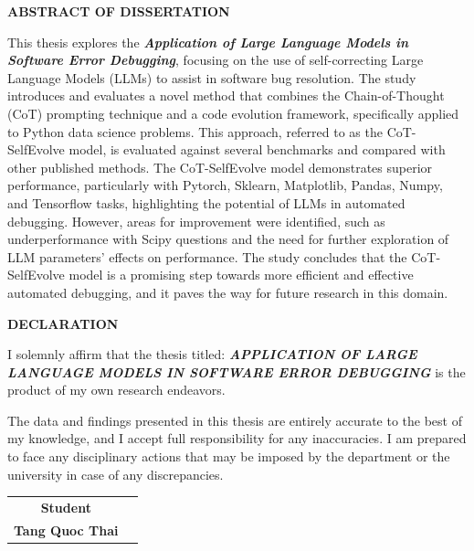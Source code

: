 \documentclass[a4paper,oneside]{book}
\begin{document}
\newpage
\begin{titlepage}
  \begin{center}
    \large\bf ABSTRACT OF DISSERTATION
  \end{center}
  This thesis explores the \textbf{\textit{Application of Large Language Models in Software Error Debugging}}, focusing on the use of self-correcting Large Language Models (LLMs) to assist in software bug resolution. The study introduces and evaluates a novel method that combines the Chain-of-Thought (CoT) prompting technique and a code evolution framework, specifically applied to Python data science problems. This approach, referred to as the CoT-SelfEvolve model, is evaluated against several benchmarks and compared with other published methods. The CoT-SelfEvolve model demonstrates superior performance, particularly with Pytorch, Sklearn, Matplotlib, Pandas, Numpy, and Tensorflow tasks, highlighting the potential of LLMs in automated debugging. However, areas for improvement were identified, such as underperformance with Scipy questions and the need for further exploration of LLM parameters' effects on performance. The study concludes that the CoT-SelfEvolve model is a promising step towards more efficient and effective automated debugging, and it paves the way for future research in this domain.
\end{titlepage}


\newpage
\begin{titlepage}
  \begin{center}
    \large\bf DECLARATION
  \end{center}
  I solemnly affirm that the thesis titled: \textbf{\textit{APPLICATION OF LARGE LANGUAGE MODELS IN SOFTWARE ERROR DEBUGGING}} is the product of my own research endeavors.

  The data and findings presented in this thesis are entirely accurate to the best of my knowledge, and I accept full responsibility for any inaccuracies. I am prepared to face any disciplinary actions that may be imposed by the department or the university in case of any discrepancies.

  \begin{flushright}
    \begin{tabular}{c c}
      \textbf{Student}        & \textbf{} \\[2cm]
      \textbf{Tang Quoc Thai} & \textbf{} \\
    \end{tabular}
  \end{flushright}
\end{titlepage}
\end{document}
